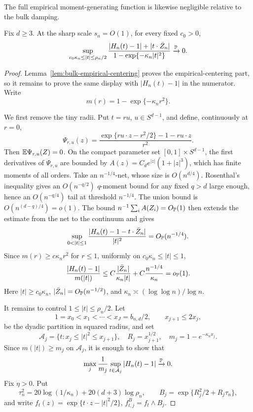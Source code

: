 The full empirical moment-generating function is likewise negligible relative
to the bulk damping.
\begin{lemma}
\label{lem:bulk-exponential-process}
Fix \(d\ge3\). At the sharp scale \(s_n=O(1)\), for every fixed \(c_0>0\),
\[
    \sup_{c_0\kappa_n\le |t|\le\rho_n/2}
    \frac{|H_n(t)-1|+|t\cdot\bar Z_n|}
         {1-\exp\{-\kappa_n|t|^2\}}
    \xrightarrow{\mathbb P}0 .
\]
\end{lemma}

\begin{proof}
Lemma~\ref{lem:bulk-empirical-centering} proves the empirical-centering
part, so it remains to prove the same display with \(|H_n(t)-1|\) in the
numerator.  Write
\[
    m(r)=1-\exp\{-\kappa_nr^2\}.
\]

We first remove the tiny radii.  Put \(t=ru\), \(u\in S^{d-1}\), and
define, continuously at \(r=0\),
\[
    \Psi_{r,u}(z)
    =
    \frac{\exp\{ru\cdot z-r^2/2\}-1-ru\cdot z}{r^2}.
\]
Then \(\mathbb E\Psi_{r,u}(Z)=0\).  On the compact parameter set
\([0,1]\times S^{d-1}\), the first derivatives of \(\Psi_{r,u}\) are
bounded by \(A(z)=C_de^{|z|}(1+|z|^3)\), which has finite moments of all
orders.  Take an \(n^{-1/4}\)-net, whose size is \(O(n^{d/4})\).  Rosenthal's
inequality gives an \(O(n^{-q/2})\) \(q\)-moment bound for any fixed \(q>d\)
large enough, hence an \(O(n^{-q/4})\) tail at threshold \(n^{-1/4}\).  The
union bound is \(O(n^{(d-q)/4})=o(1)\).  The bound
\(n^{-1}\sum_iA(Z_i)=O_{\mathbb P}(1)\) then extends the estimate from the net
to the continuum and gives
\[
    \sup_{0<|t|\le1}
    \frac{|H_n(t)-1-t\cdot\bar Z_n|}{|t|^2}
    =O_{\Pbb}(n^{-1/4}).
\]
Since \(m(r)\ge c\kappa_nr^2\) for \(r\le1\), uniformly on
\(c_0\kappa_n\le |t|\le1\),
\[
    \frac{|H_n(t)-1|}{m(|t|)}
    \le
    C\frac{|\bar Z_n|}{\kappa_n|t|}
    +C\frac{n^{-1/4}}{\kappa_n}
    =
    o_{\mathbb P}(1).
\]
Here \(|t|\ge c_0\kappa_n\), \(|\bar Z_n|=O_{\mathbb P}(n^{-1/2})\), and
\(\kappa_n\asymp(\log\log n)/\log n\).

It remains to control \(1\le |t|\le\rho_n/2\).  Let
\[
    1=x_0<x_1<\cdots <x_J=b_{n,d}/2,\qquad x_{j+1}\le2x_j,
\]
be the dyadic partition in squared radius, and set
\[
    \mathcal A_j=\{t:x_j\le |t|^2\le x_{j+1}\},\quad
    R_j=x_{j+1}^{1/2},\quad
    m_j=1-e^{-\kappa_nx_j}.
\]
Since \(m(|t|)\ge m_j\) on \(\mathcal A_j\), it is enough to show that
\[
    \max_j\frac1{m_j}\sup_{t\in\mathcal A_j}|H_n(t)-1|
    \xrightarrow{\mathbb P}0 .
\]
Fix \(\eta>0\).  Put
\[
    \tau_n^2=20\log(1/\kappa_n)+20(d+3)\log\rho_n,\qquad
    B_j=\exp\{R_j^2/2+R_j\tau_n\},
\]
and write \(f_t(z)=\exp\{t\cdot z-|t|^2/2\}\), \(f_{t,j}^B=f_t\wedge B_j\).


\end{proof}

